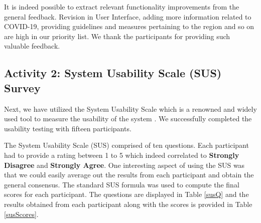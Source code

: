 It is indeed possible to extract relevant functionality improvements from the general feedback. Revision in User Interface, adding more information related to COVID-19, providing guidelines and measures pertaining to the region and so on are high in our priority list. We thank the participants for providing such valuable feedback.

\subsection{Activity 2: System Usability Scale (SUS) Survey}

Next, we have utilized the System Usability Scale which is a renowned and widely used tool to measure the usability of the system \cite{SUS2021, JBR1986}. We successfully completed the usability testing with fifteen participants. 

The System Usability Scale (SUS) comprised of ten questions. Each participant had to provide a rating between 1 to 5 which indeed correlated to \textbf{Strongly Disagree} and \textbf{Strongly Agree}. One interesting aspect of using the SUS was that we could easily average out the results from each participant and obtain the general consensus. The standard SUS formula was used to compute the final scores \cite{THO2015} for each participant. The questions are displayed in Table \ref{susQ} and the results obtained from each participant along with the scores is provided in Table \ref{susScores}.

